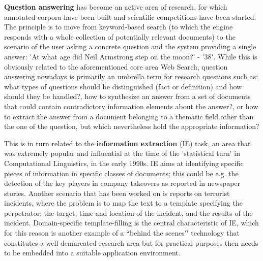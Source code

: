\begin{multicols}{2}
{\bf Question answering} has become an active area of research, for
which annotated corpora have been built and scientific competitions
have been started. The principle is to move from keyword-based search
(to which the engine responds with a whole collection of potentially
relevant documents) to the scenario of the user asking a concrete
question and the system providing a single answer: {\mbox '}At what
age did Neil Armstrong step on the moon?{\mbox '} - {\mbox '}38{\mbox
  '}. While this is obviously related to the aforementioned core area
Web Search, question answering nowadays is primarily an umbrella term
for research questions such as: what types of questions should be
distinguished (fact or definition) and how should they be handled?, how
to synthesize an answer from a set of documents that could contain
contradictory information elements about the answer?, or how to extract
the answer from a document belonging to a thematic field other than
the one of the question, but which nevertheless hold the appropriate
information?

This is in turn related to the {\bf information extraction} (IE) task, an
area that was extremely popular and influential at the time of the
{\mbox '}statistical turn{\mbox '} in Computational Linguistics, in the early
1990s. IE aims at identifying specific pieces of information in
specific classes of documents; this could be e.g. the detection of the
key players in company takeovers as reported in newspaper
stories. Another scenario that has been worked on is reports on
terrorist incidents, where the problem is to map the text to a
template specifying the perpetrator, the target, time and location of
the incident, and the results of the incident. Domain-specific
template-filling is the central characteristic of IE, which for this
reason is another example of a ``behind the scenes{\mbox '}{\mbox '} technology that
constitutes a well-demarcated research area but for practical purposes
then needs to be embedded into a suitable application environment.


\end{multicols}
